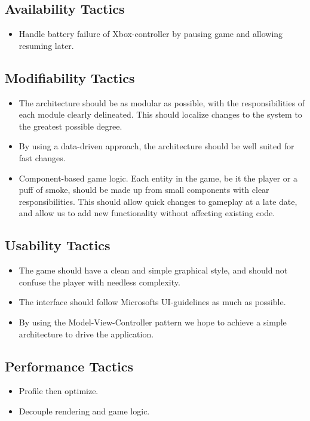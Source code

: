 \subsection{Availability Tactics}
\begin{itemize}
	\item Handle battery failure of Xbox-controller by pausing game and
	allowing resuming later.
\end{itemize}

\subsection{Modifiability Tactics}
\begin{itemize}
	\item The architecture should be as modular as possible, with 	
	the responsibilities of each module clearly delineated.  This should
	localize changes to the system to the greatest possible degree.
	\item By using a data-driven approach, the architecture should be well
	suited for fast changes.
	\item Component-based game logic.  Each entity in the game, be it the
	player or a puff of smoke, should be made up from small components with
	clear responsibilities.  This should allow quick changes to gameplay at
	a late date, and allow us to add new functionality without affecting
	existing code.
\end{itemize}

\subsection{Usability Tactics}
\begin{itemize}
	\item The game should have a clean and simple graphical style, and should
	not confuse the player with needless complexity.
	\item The interface should follow Microsofts UI-guidelines as much as 
	possible.
	\item By using the Model-View-Controller pattern we hope to achieve a 
	simple architecture to drive the application.
\end{itemize}

\subsection{Performance Tactics}
\begin{itemize}
	\item Profile then optimize.
	\item Decouple rendering and game logic.
\end{itemize}

